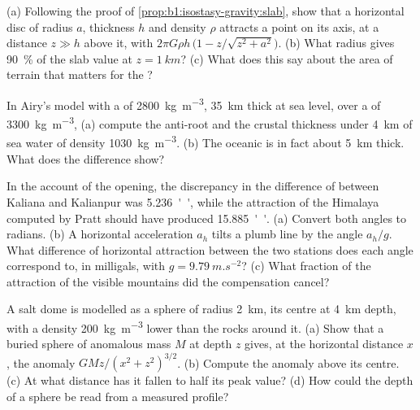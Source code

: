 \begin{exercise}[$\star\star$]\label{exo:b1:isostasy-gravity:7}
(a) Following the proof of \cref{prop:b1:isostasy-gravity:slab}, show that a
horizontal disc of radius $a$, thickness $h$ and density $\rho$ attracts a point
on its axis, at a distance $z \gg h$ above it, with $2\pi G\rho h\,\bigl(1 -
z/\sqrt{z^2 + a^2}\bigr)$. (b) What radius gives \qty{90}{\percent} of the slab
value at $z = \qty{1}{km}$? (c) What does this say about the area of terrain
that matters for the ?
\end{exercise}

\begin{exercise}[$\star\star$]\label{exo:b1:isostasy-gravity:8}
In Airy's model with a  of \qty{2800}{kg.m^{-3}}, \qty{35}{km} thick at sea
level, over a  of \qty{3300}{kg.m^{-3}}, (a) compute the anti-root and the
crustal thickness under \qty{4}{km} of sea water of density \qty{1030}{kg.m^{-3}}.
(b) The oceanic  is in fact about \qty{5}{km} thick. What does the
difference show? %
\end{exercise}

\begin{exercise}[$\star\star$]\label{exo:b1:isostasy-gravity:9}
In the account of the opening, the discrepancy in the difference of 
between Kaliana and Kalianpur was \qty{5.236}{''}, while the attraction of the
Himalaya computed by Pratt should have produced \qty{15.885}{''}. (a) Convert
both angles to radians. (b) A horizontal acceleration $a_h$ tilts a plumb line by
the angle $a_h/g$. What difference of horizontal attraction between the two
stations does each angle correspond to, in milligals, with
$g = \qty{9.79}{m.s^{-2}}$? (c) What fraction of the attraction of the visible
mountains did the compensation cancel?
\end{exercise}

\begin{exercise}[$\star\star\star$]\label{exo:b1:isostasy-gravity:10}
A salt dome is modelled as a sphere of radius \qty{2}{km}, its centre at
\qty{4}{km} depth, with a density \qty{200}{kg.m^{-3}} lower than the rocks
around it. (a) Show that a buried sphere of anomalous mass $M$ at depth $z$
gives, at the horizontal distance $x$, the anomaly $GMz/(x^2 + z^2)^{3/2}$.
(b) Compute the anomaly above its centre. (c) At what distance has it fallen
to half its peak value? (d) How could the depth of a sphere be read from a
measured profile?
\end{exercise}

